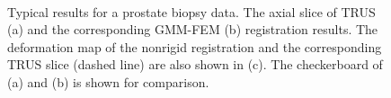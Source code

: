 \documentclass[journal]{IEEEtran}
\begin{document}
\begin{figure}
	\centering
	\hfill
	\\
	\hfill
    \caption{Typical results for a prostate biopsy data. The axial slice of TRUS (a) and the corresponding GMM-FEM (b) registration results. The deformation map of the nonrigid registration and the corresponding TRUS slice (dashed line) are also shown in (c). The checkerboard of (a) and (b) is shown for comparison. \label{fig:exp1fig2}}
\end{figure}
\end{document}
